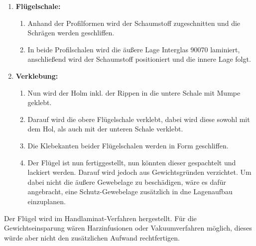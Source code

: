\begin{enumerate}
\begin{enumerate}
	\end{enumerate}
	\item \textbf{Flügelschale:}
	\begin{enumerate}
		\item Anhand der Profilformen wird der Schaumstoff zugeschnitten und die Schrägen werden geschliffen.
		\item In beide Profilschalen wird die äußere Lage Interglas 90070 laminiert, anschließend wird der Schaumstoff positioniert und die innere Lage folgt.
	\end{enumerate}
	\item \textbf{Verklebung:}
	\begin{enumerate}
		\item Nun wird der Holm inkl. der Rippen in die untere Schale mit Mumpe geklebt.
		\item Darauf wird die obere Flügelschale verklebt, dabei wird diese sowohl mit dem Hol, als auch mit der unteren Schale verklebt.
		\item Die Klebekanten beider Flügelschalen werden in Form geschliffen.
		\item Der Flügel ist nun fertiggestellt, nun könnten dieser gespachtelt und lackiert werden. Darauf wird jedoch aus Gewichtsgründen verzichtet. Um dabei nicht die äußere Gewebelage zu beschädigen, wäre es dafür angebracht, eine Schutz-Gewebelage zusätzlich in dne Lagenaufbau einzuplanen.
	\end{enumerate}
\end{enumerate}

\noindent Der Flügel wird im Handlaminat-Verfahren hergestellt. Für die Gewichtseinsparung wären Harzinfusionen oder Vakuumverfahren möglich, dieses würde aber nicht den zusätzlichen Aufwand rechtfertigen.
